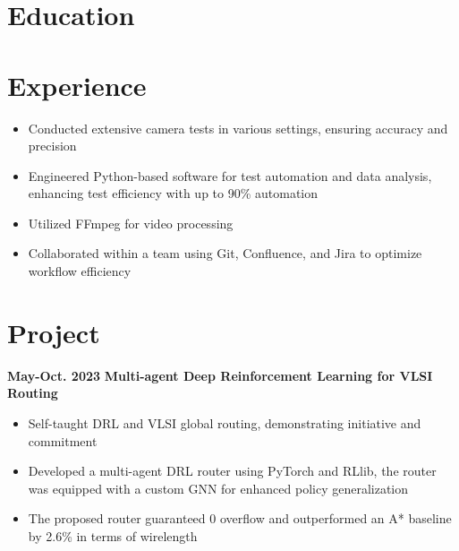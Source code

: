 \documentclass[11pt,a4paper,sans]{moderncv}
\begin{document}
\makecvtitle

\section{Education}

\section{Experience}
{
    \begin{itemize}
    \item Conducted extensive camera tests in various settings, ensuring accuracy and precision
    \item Engineered Python-based software for test automation and data analysis, enhancing test efficiency with up to 90\% automation
    \item Utilized FFmpeg for video processing
    \item Collaborated within a team using Git, Confluence, and Jira to optimize workflow efficiency
    \end{itemize}
}

\section{Project}

\cventry
{\textnormal{\textbf{May-Oct. 2023}}}
{\textnormal{\textbf{Multi-agent Deep Reinforcement Learning for VLSI Routing}}}
{}{}{}
{
    \begin{itemize}
    \item Self-taught DRL and VLSI global routing, demonstrating initiative and commitment
    \item Developed a multi-agent DRL router using PyTorch and RLlib, the router was equipped with a custom GNN for enhanced policy generalization
    \item The proposed router guaranteed 0 overflow and outperformed an A* baseline by 2.6\% in terms of wirelength
\end{itemize}
}
\end{document}
